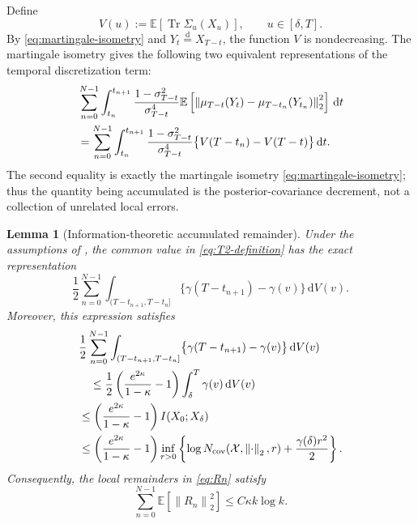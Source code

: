 \documentclass[11pt]{article}
\newtheorem{lemma}[theorem]{Lemma}
\theoremstyle{definition}
\newcommand{\E}{\mathbb{E}}
\newcommand{\norm}[1]{\left\lVert #1\right\rVert_2}
\newcommand{\Tr}{\operatorname{Tr}}
\newcommand{\dd}{\,\mathrm{d}}
\begin{document}
Define
\begin{equation}
    V(u):=\E\left[\Tr\Sigma_u(X_u)\right],
    \qquad u\in[\delta,T].
    \label{eq:V-def}
\end{equation}
By \eqref{eq:martingale-isometry} and
$Y_t\overset{\mathrm d}=X_{T-t}$, the function $V$ is nondecreasing.
The martingale isometry gives the following two equivalent
representations of the temporal discretization term:
\begin{align}
    &\sum_{n=0}^{N-1}
    \int_{t_n}^{t_{n+1}}
    \frac{1-\sigma_{T-t}^2}{\sigma_{T-t}^4}
    \E\left[
       \norm{
          \mu_{T-t}(Y_t)
          -\mu_{T-t_n}(Y_{t_n})
       }^2
    \right]\dd t\notag\\
    &=
    \sum_{n=0}^{N-1}
    \int_{t_n}^{t_{n+1}}
    \frac{1-\sigma_{T-t}^2}{\sigma_{T-t}^4}
    \bigl\{V(T-t_n)-V(T-t)\bigr\}\dd t.
\label{eq:T2-definition}
\end{align}
The second equality is exactly the martingale isometry
\eqref{eq:martingale-isometry}; thus the quantity being accumulated is
the posterior-covariance decrement, not a collection of unrelated
local errors.

\begin{lemma}[Information-theoretic accumulated remainder]
\label{lem:remainder}
Under the assumptions of , the common value in
\eqref{eq:T2-definition} has the exact representation
\begin{equation}
    \frac12
    \sum_{n=0}^{N-1}
    \int_{(T-t_{n+1},T-t_n]}
    \bigl\{\gamma(T-t_{n+1})-\gamma(v)\bigr\}\dd V(v).
    \label{eq:T2-Stieltjes}
\end{equation}
Moreover, this expression satisfies
\begin{align}
    &\frac12
    \sum_{n=0}^{N-1}
    \int_{(T-t_{n+1},T-t_n]}
    \bigl\{\gamma(T-t_{n+1})-\gamma(v)\bigr\}\dd V(v)\notag\\
    &\quad\le
    \frac12\left(\frac{e^{2\kappa}}{1-\kappa}-1\right)
    \int_\delta^T\gamma(v)\dd V(v)
    \label{eq:T2-SNR-budget}\\
    &\le
    \left(\frac{e^{2\kappa}}{1-\kappa}-1\right)
    I(X_0;X_\delta)
    \label{eq:T2-mutual-information}\\
    &\le
    \left(\frac{e^{2\kappa}}{1-\kappa}-1\right)
    \inf_{r>0}
    \left\{
       \log N_{\mathrm{cov}}(\mathcal X,\norm{\cdot},r)
       +\frac{\gamma(\delta)r^2}{2}
    \right\}.
    \label{eq:T2-entropy-envelope}
\end{align}
Consequently, the local remainders in \eqref{eq:Rn} satisfy
\begin{equation}
    \sum_{n=0}^{N-1}\E\left[\norm{R_n}^2\right]
    \le C\kappa k\log k.
    \label{eq:remainder-bound}
\end{equation}
\end{lemma}
\end{document}
